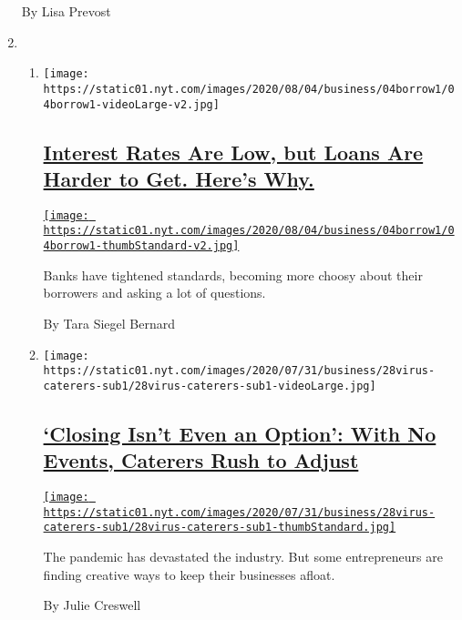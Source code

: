 \begin{enumerate}
  By Lisa Prevost
\item
  \begin{enumerate}
  \def\labelenumii{\arabic{enumii}.}
  \item
    \texttt{[image: https://static01.nyt.com/images/2020/08/04/business/04borrow1/04borrow1-videoLarge-v2.jpg]}

    \hypertarget{interest-rates-are-low-but-loans-are-harder-to-get-heres-why}{%
    \subsection{\texorpdfstring{\href{/2020/08/04/your-money/mortgage-loans-credit-cards-coronavirus.html}{Interest
    Rates Are Low, but Loans Are Harder to Get. Here's
    Why.}}{Interest Rates Are Low, but Loans Are Harder to Get. Here's Why.}}\label{interest-rates-are-low-but-loans-are-harder-to-get-heres-why}}

    \href{/2020/08/04/your-money/mortgage-loans-credit-cards-coronavirus.html}{\texttt{[image: https://static01.nyt.com/images/2020/08/04/business/04borrow1/04borrow1-thumbStandard-v2.jpg]}}

    Banks have tightened standards, becoming more choosy about their
    borrowers and asking a lot of questions.

    By Tara Siegel Bernard
  \item
    \texttt{[image: https://static01.nyt.com/images/2020/07/31/business/28virus-caterers-sub1/28virus-caterers-sub1-videoLarge.jpg]}

    \hypertarget{closing-isnt-even-an-option-with-no-events-caterers-rush-to-adjust}{%
    \subsection{\texorpdfstring{\href{/2020/08/04/business/coronavirus-struggling-caterers.html}{`Closing
    Isn't Even an Option': With No Events, Caterers Rush to
    Adjust}}{`Closing Isn't Even an Option': With No Events, Caterers Rush to Adjust}}\label{closing-isnt-even-an-option-with-no-events-caterers-rush-to-adjust}}

    \href{/2020/08/04/business/coronavirus-struggling-caterers.html}{\texttt{[image: https://static01.nyt.com/images/2020/07/31/business/28virus-caterers-sub1/28virus-caterers-sub1-thumbStandard.jpg]}}

    The pandemic has devastated the industry. But some entrepreneurs are
    finding creative ways to keep their businesses afloat.

    By Julie Creswell
  \end{enumerate}
\end{enumerate}


